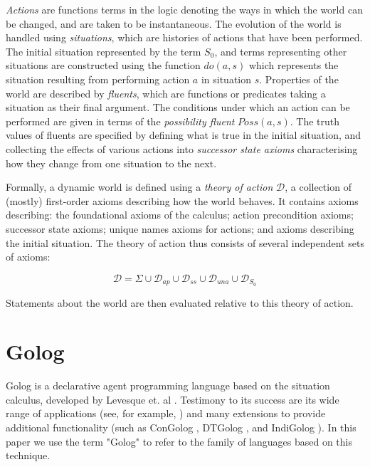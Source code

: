 \documentclass{llncs}
\begin{document}
\emph{Actions} are functions terms in the logic denoting the ways
in which the world can be changed, and are taken to be instantaneous.
The evolution of the world is handled using \emph{situations}, which
are histories of actions that have been performed. The initial situation
represented by the term $S_{0}$, and terms representing other situations
are constructed using the function $do(a,s)$ which represents the
situation resulting from performing action $a$ in situation $s$.
Properties of the world are described by \emph{fluents}, which are
functions or predicates taking a situation as their final argument.
The conditions under which an action can be performed are given in
terms of the \emph{possibility fluent} $Poss(a,s)$. The truth values
of fluents are specified by defining what is true in the initial situation,
and collecting the effects of various actions into \emph{successor
state axioms} characterising how they change from one situation to
the next.

Formally, a dynamic world is defined using a \emph{theory of action}
$\mathcal{D}$, a collection of (mostly) first-order axioms describing
how the world behaves. It contains axioms describing: the foundational
axioms of the calculus; action precondition axioms; successor state
axioms; unique names axioms for actions; and axioms describing the
initial situation. The theory of action thus consists of several independent
sets of axioms:

\[
\mathcal{D}=\Sigma\cup\mathcal{D}_{ap}\cup\mathcal{D}_{ss}\cup\mathcal{D}_{una}\cup\mathcal{D}_{S_{0}}
\]


Statements about the world are then evaluated relative to this theory
of action.


\section{Golog}

\label{sec:Golog}

Golog is a declarative agent programming language based on the situation
calculus, developed by Levesque et. al \cite{levesque97golog}. Testimony
to its success are its wide range of applications (see, for example,
\cite{levesque97golog,Ferrein2005readylog} ) and many extensions
to provide additional functionality (such as ConGolog \cite{giacomo00congolog},
DTGolog \cite{boutilier00dtgolog}, and IndiGolog \cite{giacomo99indigolog}).
In this paper we use the term "Golog" to refer to the family
of languages based on this technique.
\end{document}

